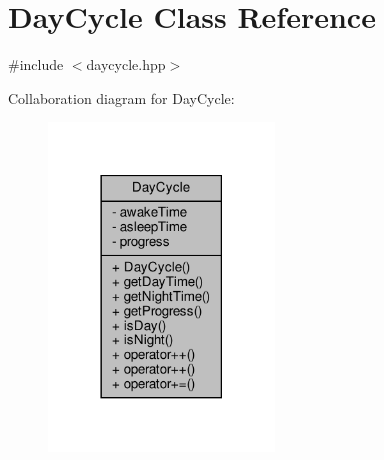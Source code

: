 \hypertarget{classDayCycle}{}\section{Day\+Cycle Class Reference}
\label{classDayCycle}


{\ttfamily \#include $<$daycycle.\+hpp$>$}



Collaboration diagram for Day\+Cycle\+:\nopagebreak
\begin{figure}[H]
\begin{center}
\leavevmode
\includegraphics[width=170pt]{classDayCycle__coll__graph}
\end{center}
\end{figure}
